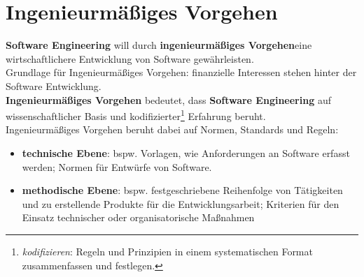 \section{Ingenieurmäßiges Vorgehen}

\begin{tcolorbox}[title=Ingenieurmäßiges Vorgehen]
\textbf{Software Engineering} will durch \textbf{ingenieurmäßiges Vorgehen}eine wirtschaftlichere Entwicklung von Software gewährleisten.\\
Grundlage für Ingenieurmäßiges Vorgehen: finanzielle Interessen stehen hinter der Software Entwicklung.\\

\noindent
\textbf{Ingenieurmäßiges Vorgehen} bedeutet, dass \textbf{Software Engineering} auf wissenschaftlicher Basis und kodifizierter\footnote{
    \textit{kodifizieren}: Regeln und Prinzipien in einem systematischen Format zusammenfassen und festlegen.
} Erfahrung beruht.\\

\noindent
Ingenieurmäßiges Vorgehen beruht dabei auf Normen, Standards und Regeln:

\begin{itemize}
    \item\textbf{technische Ebene}: bspw. Vorlagen, wie Anforderungen an Software erfasst werden; Normen für Entwürfe von Software.
    \item \textbf{methodische Ebene}: bspw. festgeschriebene Reihenfolge von Tätigkeiten und zu erstellende Produkte für die Entwicklungsarbeit; Kriterien für den Einsatz technischer oder organisatorische Maßnahmen
\end{itemize}
\end{tcolorbox}